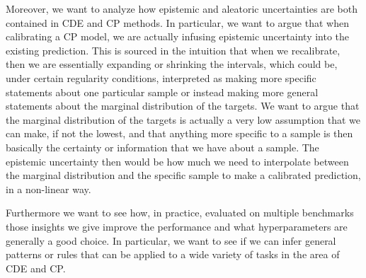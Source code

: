 Moreover, we want to analyze how epistemic and aleatoric uncertainties are both contained in CDE and CP methods. In particular, we want to argue that when calibrating a CP model, we are actually infusing epistemic uncertainty into the existing prediction. This is sourced in the intuition that when we recalibrate, then we are essentially expanding or shrinking the intervals, which could be, under certain regularity conditions, interpreted as making more specific statements about one particular sample or instead making more general statements about the marginal distribution of the targets. We want to argue that the marginal distribution of the targets is actually a very low assumption that we can make, if not the lowest, and that anything more specific to a sample is then basically the certainty or information that we have about a sample. The epistemic uncertainty then would be how much we need to interpolate between the marginal distribution and the specific sample to make a calibrated prediction, in a non-linear way.

Furthermore we want to see how, in practice, evaluated on multiple benchmarks those insights we give improve the performance and what hyperparameters are generally a good choice. In particular, we want to see if we can infer general patterns or rules that can be applied to a wide variety of tasks in the area of CDE and CP.




